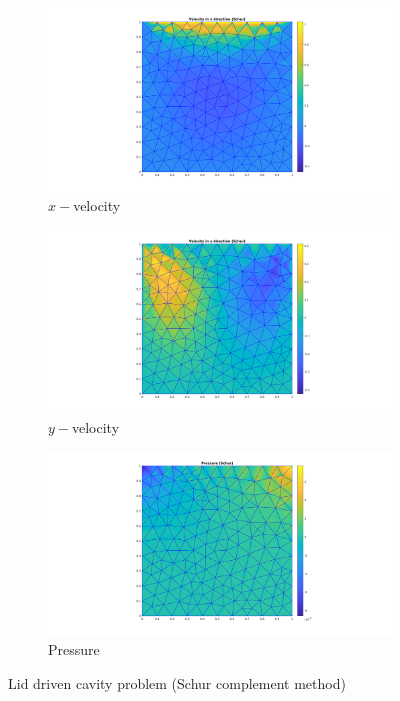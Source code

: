 \documentclass[a4paper,oneside,openright,spanish,english]{book}
\begin{document}
\begin{figure}
\begin{subfigure}{\textwidth}	
  \includegraphics[width=0.8\linewidth]{velocity_x_lid_driven_cavity.png}
  \caption{$x-$velocity} 
  \label{x_vel_stoke_schur_lid}
\end{subfigure}
\begin{subfigure}{\textwidth}	
  \includegraphics[width=0.8\linewidth]{velocity_y_lid_driven_cavity.png}
    \caption{$y-$velocity} 
    \label{y_vel_stoke_schur_lid}
\end{subfigure}
\begin{subfigure}{\textwidth}	
  \includegraphics[width=0.8\linewidth]{pressure_lid_driven_cavity.png}
    \caption{Pressure} 
    \label{pressure_stoke_schur_lid}
\end{subfigure}
\caption{Lid driven cavity problem (Schur complement method)}
\label{stoke_schur_lid}
\end{figure}
\end{document}
